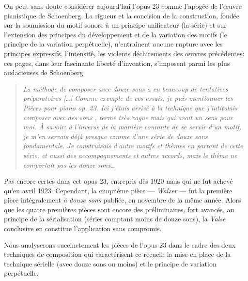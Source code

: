 \documentclass[11pt,a4paper]{scrreprt}
\begin{document}
On peut sans doute considérer aujourd'hui l'opus 23 comme l'apogée de l'\oe{}uvre pianistique de Schoenberg. La rigueur et la concision de la construction, fondée sur la soumission du motif sonore à un principe unificateur (la série) et sur l'extension des principes du développement et de la variation des motifs (le principe de la variation perpétuelle), n'entraînent aucune rupture avec les principes expressifs, l'intensité, les violents déchirements des \oe{}uvres précédentes: ces pages, dans leur fascinante liberté d'invention, s'imposent parmi les plus audacieuses de Schoenberg.

\begin{quote}
\emph{La méthode de composer avec douze sons a eu beaucoup de tentatives préparatoires [\ldots{}] Comme exemple de ces essais, je puis mentionner les \emph{Pièces pour piano op. 23}. Ici j'étais arrivé à la technique que j'intitulais \og{} composer avec des sons \fg{}, terme très vague mais qui avait un sens pour moi. À savoir: à l'inverse de la manière courante de se servir d'un motif, je m'en servais déjà presque comme d'une série de douze sons fondamentale. Je construisais d'autre motifs et thèmes en partant de cette série, et aussi des accompagnements et autres accords, mais le thème ne comportait pas les douze sons\ldots}
\end{quote}
Pas encore certes dans cet opus 23, entrepris dès 1920 mais qui ne fut achevé qu'en avril 1923. Cependant, la cinquième pièce --- \emph{Walzer} --- fut la première pièce intégralement \emph{à douze sons} publiée, en novembre de la même année. Alors que les quatre premières pièces sont encore des préliminaires, fort avancés, au principe de la sérialisation (séries comptant moins de douze sons), la \emph{Valse} conclusive en constitue l'application sans compromis.

Nous analyserons succinctement les pièces de l'opus 23 dans le cadre des deux techniques de composition qui caractérisent ce recueil: la mise en place de la technique sérielle (avec douze sons ou moins) et le principe de variation perpétuelle.
\end{document}
